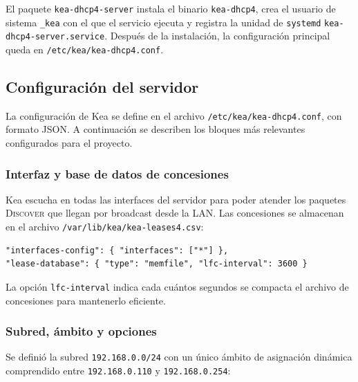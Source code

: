 El paquete \texttt{kea-dhcp4-server} instala el binario
\texttt{kea-dhcp4}, crea el usuario de sistema \texttt{\_kea} con el que el
servicio ejecuta y registra la unidad de \texttt{systemd}
\texttt{kea-dhcp4-server.service}. Después de la instalación, la
configuración principal queda en \texttt{/etc/kea/kea-dhcp4.conf}.

\subsection{Configuración del servidor}

La configuración de Kea se define en el archivo
\texttt{/etc/kea/kea-dhcp4.conf}, con formato JSON. A continuación se
describen los bloques más relevantes configurados para el proyecto.


\subsubsection{Interfaz y base de datos de concesiones}

Kea escucha en todas las interfaces del servidor para poder atender los
paquetes \textsc{Discover} que llegan por broadcast desde la LAN. Las
concesiones se almacenan en el archivo
\texttt{/var/lib/kea/kea-leases4.csv}:

\begin{lstlisting}[style=terminal]
"interfaces-config": { "interfaces": ["*"] },
"lease-database": { "type": "memfile", "lfc-interval": 3600 }
\end{lstlisting}

La opción \texttt{lfc-interval} indica cada cuántos segundos se compacta el
archivo de concesiones para mantenerlo eficiente.

\subsubsection{Subred, ámbito y opciones}

Se definió la subred \texttt{192.168.0.0/24} con un único ámbito de
asignación dinámica comprendido entre \texttt{192.168.0.110} y
\texttt{192.168.0.254}:


